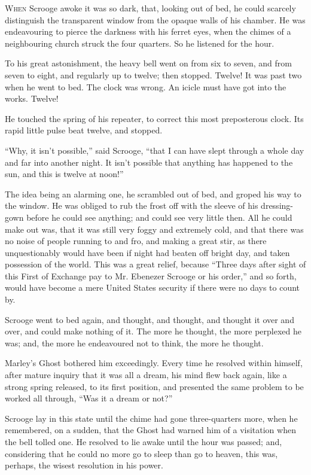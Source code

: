 \documentclass[paper=5.5in:8.5in,BCOR=15mm,twoside,DIV=15,headinclude=off,12pt,chapterprefix=off,openany,headings=huge]{scrbook} %
\begin{document}
\lettrine[loversize=.85]{W}{hen} Scrooge awoke it was so dark, that, looking out of bed, he could scarcely distinguish the transparent window from the opaque walls of his chamber. He was endeavouring to pierce the darkness with his ferret eyes, when the chimes of a neighbouring church struck the four quarters. So he listened for the hour.

To his great astonishment, the heavy bell went on from six to seven, and from seven to eight, and regularly up to twelve; then stopped. Twelve! It was past two when he went to bed. The clock was wrong. An icicle must have got into the works. Twelve!

He touched the spring of his repeater, to correct this most preposterous clock. Its rapid little pulse beat twelve, and stopped.

\enquote{Why, it isn't possible,} said Scrooge, \enquote{that I can have slept through a whole day and far into another night. It isn't possible that anything has happened to the sun, and this is twelve at noon!}

The idea being an alarming one, he scrambled out of bed, and groped his way to the window. He was obliged to rub the frost off with the sleeve of his dressing-gown before he could see anything; and could see very little then. All he could make out was, that it was still very foggy and extremely cold, and that there was no noise of people running to and fro, and making a great stir, as there unquestionably would have been if night had beaten off bright day, and taken possession of the world. This was a great relief, because \enquote{Three days after sight of this First of Exchange pay to Mr. Ebenezer Scrooge or his order,} and so forth, would have become a mere United States security if there were no days to count by.

Scrooge went to bed again, and thought, and thought, and thought it over and over, and could make nothing of it. The more he thought, the more perplexed he was; and, the more he endeavoured not to think, the more he thought.

Marley's Ghost bothered him exceedingly. Every time he resolved within himself, after mature inquiry that it was all a dream, his mind flew back again, like a strong spring released, to its first position, and presented the same problem to be worked all through, \enquote{Was it a dream or not?}

Scrooge lay in this state until the chime had gone three-quarters more, when he remembered, on a sudden, that the Ghost had warned him of a visitation when the bell tolled one. He resolved to lie awake until the hour was passed; and, considering that he could no more go to sleep than go to heaven, this was, perhaps, the wisest resolution in his power.
\end{document}
